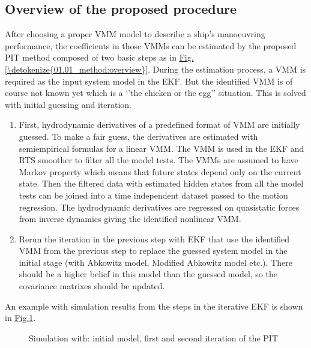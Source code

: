 \documentclass[review]{elsarticle}
\begin{document}
\subsection{Overview of the proposed procedure}
\label{\detokenize{01.01_method:overview-of-the-proposed-procedure}}
\sphinxAtStartPar
After choosing a proper VMM model to describe a ship’s manoeuvring performance, the coefficients in those VMMs can be estimated by the proposed PIT method composed of two basic steps as in \hyperref[\detokenize{01.01_method:overview}]{Fig.\@ \ref{\detokenize{01.01_method:overview}}}. During the estimation process, a VMM is required as the input system model in the EKF. But the identified VMM is of course not known yet which is a ‘’the chicken or the egg’’ situation. This is solved with initial guessing and iteration.
\begin{enumerate}
%
\item {} 
\sphinxAtStartPar
First, hydrodynamic derivatives of a pre\sphinxhyphen{}defined format of VMM are initially guessed. To make a fair guess, the derivatives are estimated with semi\sphinxhyphen{}empirical formulas for a linear VMM. The VMM is used in the EKF and RTS smoother to filter all the model tests. The VMMs are assumed to have Markov property which means that future states depend only on the current state. Then the filtered data with estimated hidden states from all the model tests can be joined into a time independent dataset passed to the motion regression. The hydrodynamic derivatives are regressed on quasi\sphinxhyphen{}static forces from inverse dynamics giving the identified nonlinear VMM.

\item {} 
\sphinxAtStartPar
Re\sphinxhyphen{}run the iteration in the previous step with EKF that use the identified VMM from the previous step to replace the guessed system model in the initial stage (with Abkowitz model, Modified Abkowitz model etc.). There should be a higher belief in this model than the guessed model, so the covariance matrixes should be updated.

\end{enumerate}

\sphinxAtStartPar
An example with simulation results from the steps in the iterative EKF is shown in \hyperref[\detokenize{01.01_method:iterations}]{Fig.\@ \ref{\detokenize{01.01_method:iterations}}}.

\begin{figure}[H]
\centering
\capstart

\noindent{}
\caption{Simulation with: initial model, first and second iteration of the PIT}\label{\detokenize{01.01_method:iterations}}\end{figure}
\end{document}
